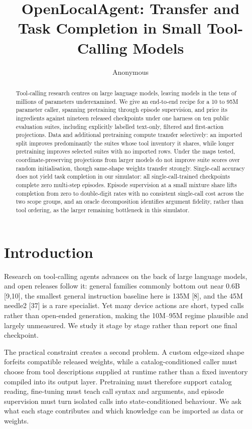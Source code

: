 \documentclass{article}
\title{OpenLocalAgent: Transfer and Task Completion in Small Tool-Calling Models}
\author{Anonymous}
\begin{document}
\maketitle
\begin{abstract}
Tool-calling research centres on large language models, leaving models in the tens of millions
of parameters underexamined. We give an end-to-end recipe for a 10 to 95M parameter caller,
spanning pretraining through episode supervision, and price its ingredients against nineteen
released checkpoints under one harness on ten public
evaluation suites, including explicitly labelled text-only, filtered and first-action projections.
Data and additional pretraining compute transfer selectively: an imported split improves predominantly the suites
whose tool inventory it shares, while longer pretraining improves selected suites with no imported
rows. Under the maps tested, coordinate-preserving projections from larger models do not
improve suite scores over random initialisation, though same-shape
weights transfer strongly. Single-call accuracy does not yield task completion in our
simulator: all single-call-trained checkpoints complete zero multi-step episodes. Episode
supervision at a small mixture share lifts completion from zero to double-digit rates
with no consistent single-call cost across the two scope groups, and an oracle decomposition identifies argument fidelity, rather than tool
ordering, as the larger remaining bottleneck in this simulator.
\end{abstract}
\section{Introduction}

Research on tool-calling agents advances on the back of large language models, and open
releases follow it: general families commonly bottom out near 0.6B [9,10], the smallest general
instruction baseline here is 135M [8], and the 45M needle2 [37] is a rare specialist. Yet many
device actions are short, typed calls rather than open-ended generation, making the 10M--95M
regime plausible and largely unmeasured. We study it stage by stage rather than report one final
checkpoint.


The practical constraint creates a second problem. A custom edge-sized shape forfeits compatible
released weights, while a catalog-conditioned caller must choose from tool descriptions supplied at
runtime rather than a fixed inventory compiled into its output layer. Pretraining must therefore
support catalog reading, fine-tuning must teach call syntax and arguments, and episode supervision
must turn isolated calls into state-conditioned behaviour. We ask what each stage contributes and
which knowledge can be imported as data or weights.
\end{document}
